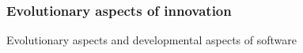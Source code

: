 \documentclass{beamer}
\begin{document}

\begin{frame}
\frametitle{Evolutionary aspects of innovation}

Evolutionary aspects and developmental aspects of software
\end{frame}
\end{document}
